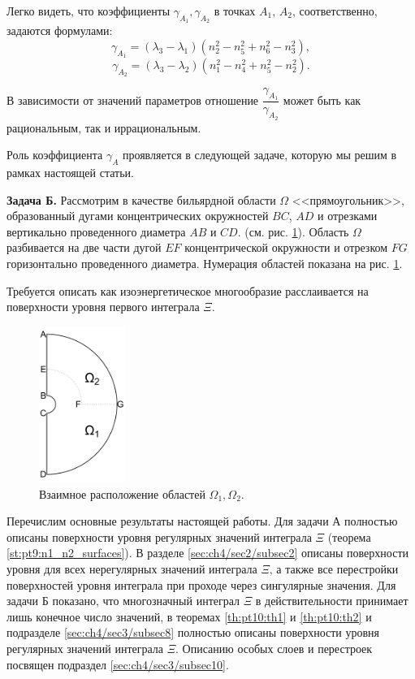 Легко видеть, что коэффициенты $\gamma_{A_1}, \gamma_{A_2}$ в точках $A_1$, $A_2$, соответственно, задаются формулами:
$$\gamma_{A_1} = (\lambda_3 - \lambda_1)(n_2^2 - n_5^2 + n_6^2 - n_3^2),$$
$$\gamma_{A_2} = (\lambda_3 - \lambda_2)(n_1^2 - n_4^2 + n_5^2 - n_2^2).$$

В зависимости от значений параметров отношение $\dfrac{\gamma_{A_1}}{\gamma_{A_2}}$ может быть как рациональным, так и иррациональным.

Роль коэффициента $\gamma_A$ проявляется в следующей задаче, которую мы решим в рамках настоящей статьи.

\textbf{Задача Б.} Рассмотрим в качестве бильярдной области $\Omega$  <<прямоугольник>>, образованный дугами концентрических окружностей $BC$, $AD$ и отрезками вертикально проведенного диаметра $AB$ и $CD$. (см. рис. \ref{fig:pt8:_example9}).
Область $\Omega$ разбивается на две части дугой  $EF$ концентрической окружности  и отрезком $FG$ горизонтально проведенного диаметра. Нумерация областей показана на рис. \ref{fig:pt8:_example9}.

Требуется описать как изоэнергетическое многообразие расслаивается на поверхности уровня первого интеграла $\Xi$.


\begin{figure}[!htb]
\centering
   \includegraphics[width=0.25\textwidth]{images/ch4/section1/imgB.pdf}   
    \caption{Взаимное расположение областей $\Omega_1, \Omega_2$.}
    \label{fig:pt8:_example9}
\end{figure}

Перечислим основные результаты настоящей работы.
Для задачи А полностью описаны поверхности уровня регулярных значений интеграла $\Xi$ (теорема \ref{st:pt9:n1_n2_surfaces}).
В разделе \ref{sec:ch4/sec2/subsec2} описаны поверхности уровня для всех нерегулярных значений интеграла $\Xi$, а также все перестройки поверхностей уровня интеграла при проходе через сингулярные значения. 
Для задачи Б  показано, что многозначный интеграл $\Xi$ в действительности принимает лишь конечное число значений, в теоремах \ref{th:pt10:th1} и \ref{th:pt10:th2} и подразделе \ref{sec:ch4/sec3/subsec8} полностью описаны поверхности уровня регулярных значений интеграла $\Xi$.
Описанию особых слоев и перестроек посвящен подраздел \ref{sec:ch4/sec3/subsec10}.
\bigskip

